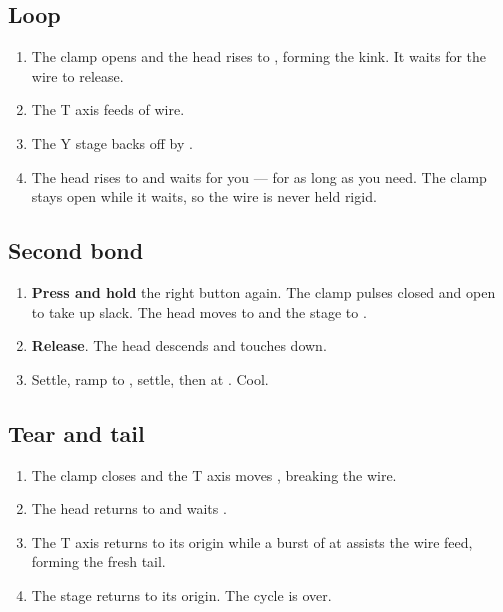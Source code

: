 \subsection*{Loop}

\begin{enumerate}[leftmargin=*,resume]
\item The clamp opens and the head rises to , forming the
  kink. It waits for the wire to release.
\item The T axis feeds  of wire.
\item The Y stage backs off by .
\item The head rises to  and waits for you --- for as
  long as you need. The clamp stays open while it waits, so the wire is never
  held rigid.
\end{enumerate}

\subsection*{Second bond}

\begin{enumerate}[leftmargin=*,resume]
\item \textbf{Press and hold} the right button again. The clamp pulses closed
  and open to take up slack. The head moves to  and the
  stage to .
\item \textbf{Release}. The head descends and touches down.
\item Settle, ramp to , settle, then  at
  . Cool.
\end{enumerate}

\subsection*{Tear and tail}

\begin{enumerate}[leftmargin=*,resume]
\item The clamp closes and the T axis moves , breaking the wire.
\item The head returns to  and waits
  .
\item The T axis returns to its origin while a burst of 
  at  assists the wire feed, forming the fresh tail.
\item The stage returns to its origin. The cycle is over.
\end{enumerate}

